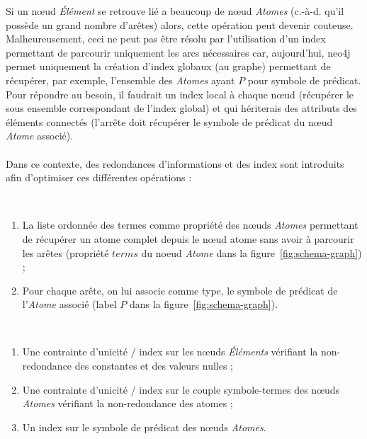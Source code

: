 Si un nœud \textit{Élément} se retrouve lié a beaucoup de nœud \textit{Atomes} (c.-à-d. qu'il possède un grand nombre d'arêtes) alors, cette opération peut devenir couteuse.
Malheureusement, ceci ne peut pas être résolu par l'utilisation d'un index permettant de parcourir uniquement les arcs nécessaires car, aujourd'hui, \gls{neo4j} permet uniquement la création d'index globaux (au graphe) permettant de récupérer, par exemple, l'ensemble des \textit{Atomes} ayant $P$ pour symbole de prédicat.
Pour répondre au besoin, il faudrait un index local à chaque nœud (récupérer le sous ensemble correspondant de l'index global) et qui hériterais des attributs des éléments connectés (l'arrête doit récupérer le symbole de prédicat du nœud \textit{Atome} associé).

\paragraph{}
Dans ce contexte, des redondances d'informations et des index sont introduits afin d'optimiser ces différentes opérations :
\begin{description}[wide=0pt]
    \item[Limiter le parcours des arêtes] ~
        \begin{enumerate}
            \item La liste ordonnée des termes comme propriété des nœuds \textit{Atomes} permettant de récupérer un atome complet depuis le nœud atome sans avoir à parcourir les arêtes (propriété $terms$ du noeud \textit{Atome} dans la figure~\ref{fig:schema-graph}) ;
            \item Pour chaque arête, on lui associe comme type, le symbole de prédicat de l'\textit{Atome} associé (label $P$ dans la figure~\ref{fig:schema-graph}).
        \end{enumerate}
    \item[Faciliter la récupération des nœuds] ~
        \begin{enumerate}
            \item Une contrainte d'unicité / index sur les nœuds \textit{Éléments} vérifiant la non-redondance des constantes et des valeurs nulles ;
            \item Une contrainte d'unicité / index sur le couple symbole-termes des nœuds \textit{Atomes} vérifiant la non-redondance des atomes ;
            \item Un index sur le symbole de prédicat des nœuds \textit{Atomes}.
        \end{enumerate}
\end{description}

